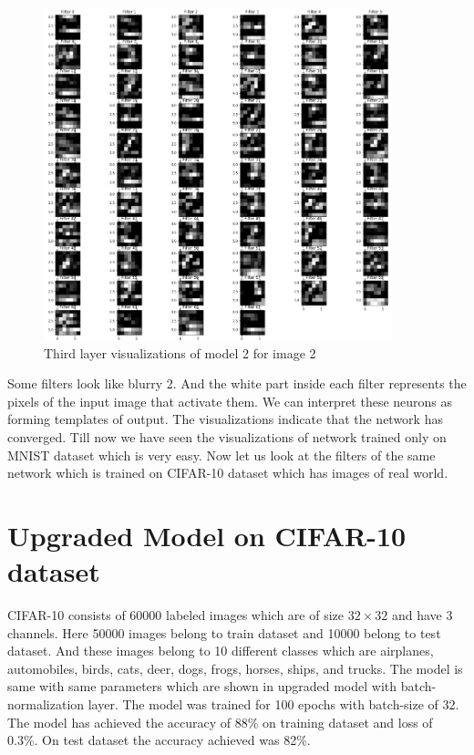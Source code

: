 \begin{figure}[h]
    \centering
    \includegraphics[width=0.9\textwidth]{thesis_template/images/23.png}
    \caption{\small Third layer visualizations of model 2 for image 2}
    \label{}
    \end{figure}
    
\newpage \noindent Some filters look like blurry 2. And the white part inside each filter represents the pixels of the input image that activate them. We can interpret these neurons as forming templates of output. The visualizations indicate that the network has converged. Till now we have seen the visualizations of network trained only on MNIST dataset which is very easy. Now let us look at the filters of the same network which is trained on CIFAR-10 dataset which has images of real world.

\newpage \section{Upgraded Model on CIFAR-10 dataset}
CIFAR-10 consists of 60000 labeled images which are of size $32 \times 32$ and have 3 channels. Here 50000 images belong to train dataset and 10000 belong to test dataset. And these images belong to 10 different classes which are airplanes, automobiles, birds, cats, deer, dogs, frogs, horses, ships, and trucks. The model is same with same parameters which are shown in upgraded model with batch-normalization layer. The model was trained for 100 epochs with batch-size of 32. The model has achieved the accuracy of 88\% on training dataset and loss of 0.3\%. On test dataset the accuracy achieved was 82\%.


